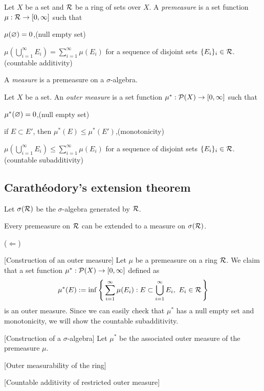 \documentclass{../exp}
\begin{document}
\begin{defn}
Let $X$ be a set and $\mathcal{R}$ be a ring of sets over $X$.
A \emph{premeasure} is a set function $\mu:\cR\to[0,\infty]$ such that
\begin{cond}
\item $\mu(\varnothing)=0$,\hfill(null empty set)
\item $\mu(\bigcup_{i=1}^\infty E_i)=\sum_{i=1}^\infty\mu(E_i)$ for a sequence of disjoint sets $\{E_i\}_i\in\mathcal{R}$.\hfill(countable additivity)
\end{cond}
A \emph{measure} is a premeasure on a $\sigma$-algebra.
\end{defn}

\begin{defn}
Let $X$ be a set.
An \emph{outer measure} is a set function $\mu^*:\cP(X)\to[0,\infty]$ such that
\begin{cond}
\item $\mu^*(\varnothing)=0$,\hfill(null empty set)
\item if $E\subset E'$, then $\mu^*(E)\le\mu^*(E')$,\hfill(monotonicity)
\item $\mu(\bigcup_{i=1}^\infty E_i)\le\sum_{i=1}^\infty\mu(E_i)$ for a sequence of disjoint sets $\{E_i\}_i\in\mathcal{R}$.\hfill(countable subadditivity)
\end{cond}
\end{defn}


\subsection{Carath\'eodory's extension theorem}
Let $\sigma(\mathcal{R})$ be the $\sigma$-algebra generated by $\mathcal{R}$.
\begin{thm}
Every premeasure on $\mathcal{R}$ can be extended to a measure on $\sigma(\mathcal{R})$.
\end{thm}
\begin{pf}
($\Leftarrow$)

[Construction of an outer measure]
Let $\mu$ be a premeasure on a ring $\mathcal{R}$.
We claim that a set function $\mu^*:\cP(X)\to[0,\infty]$ defined as
\[\mu^*(E):=\inf\left\{\,\sum_{i=1}^\infty\mu(E_i):E\subset\bigcup_{i=1}^\infty E_i,\ E_i\in\mathcal{R}\,\right\}\]
is an outer measure.
Since we can easily check that $\mu^*$ has a null empty set and monotonicity, we will show the countable subadditivity.

[Construction of a $\sigma$-algebra]
Let $\mu^*$ be the associated outer measure of the premeasure $\mu$.


[Outer measurability of the ring]


[Countable additivity of restricted outer measure]



\end{pf}
\end{document}
